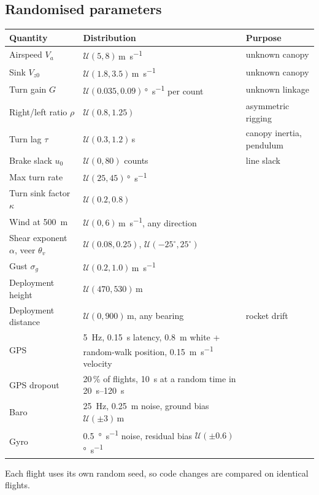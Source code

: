 \documentclass[11pt,a4paper]{article}
\begin{document}
\subsection{Randomised parameters}
\begin{center}
\small
\renewcommand{\arraystretch}{1.15}
\begin{tabularx}{\linewidth}{p{4.2cm}Yp{3.0cm}}
\toprule
\textbf{Quantity} & \textbf{Distribution} & \textbf{Purpose} \\
\midrule
Airspeed $V_a$ & $\mathcal U(5, 8)$\,\si{\meter\per\second} & unknown canopy \\
Sink $V_{z0}$ & $\mathcal U(1.8, 3.5)$\,\si{\meter\per\second} & unknown canopy \\
Turn gain $G$ & $\mathcal U(0.035, 0.09)$\,\si{\degree\per\second} per count & unknown linkage \\
Right/left ratio $\rho$ & $\mathcal U(0.8, 1.25)$ & asymmetric rigging \\
Turn lag $\tau$ & $\mathcal U(0.3, 1.2)$\,\si{\second} & canopy inertia, pendulum \\
Brake slack $u_0$ & $\mathcal U(0, 80)$ counts & line slack \\
Max turn rate & $\mathcal U(25, 45)$\,\si{\degree\per\second} & \\
Turn sink factor $\kappa$ & $\mathcal U(0.2, 0.8)$ & \\
Wind at \SI{500}{\meter} & $\mathcal U(0, 6)$\,\si{\meter\per\second}, any direction & \\
Shear exponent $\alpha$, veer $\theta_v$ & $\mathcal U(0.08, 0.25)$, $\mathcal U(-25^\circ, 25^\circ)$ & \\
Gust $\sigma_g$ & $\mathcal U(0.2, 1.0)$\,\si{\meter\per\second} & \\
Deployment height & $\mathcal U(470, 530)$\,\si{\meter} & \\
Deployment distance & $\mathcal U(0, 900)$\,\si{\meter}, any bearing & rocket drift \\
GPS & \SI{5}{\hertz}, \SI{0.15}{\second} latency, \SI{0.8}{\meter} white + random-walk position, \SI{0.15}{\meter\per\second} velocity & \\
GPS dropout & 20\,\% of flights, \SI{10}{\second} at a random time in \SIrange{20}{120}{\second} & \\
Baro & \SI{25}{\hertz}, \SI{0.25}{\meter} noise, ground bias $\mathcal U(\pm3)$\,\si{\meter} & \\
Gyro & \SI{0.5}{\degree\per\second} noise, residual bias $\mathcal U(\pm0.6)$\,\si{\degree\per\second} & \\
\bottomrule
\end{tabularx}
\end{center}
Each flight uses its own random seed, so code changes are compared on
identical flights.
\end{document}
